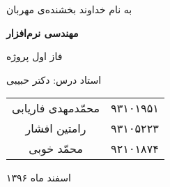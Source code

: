 \begin{center}
\large
به نام خداوند بخشنده‌ی مهربان

\Huge
\vspace*{3cm}
\textbf{مهندسی نرم‌افزار}

\vspace*{1cm}
\large
فاز اول پروژه
\vspace*{3cm}

\Large
استاد درس: دکتر حبیبی
\vspace*{2cm}

\vspace*{1cm}

\begin{tabular}{cc}
 محمّدمهدی فاریابی
	& 
۹۳۱۰۱۹۵۱
	\\
رامتین افشار
	&
۹۳۱۰۵۲۲۳
	 \\
محمّد خوبی
	&
۹۲۱۰۱۸۷۴
	 \\
\end{tabular}

 

\vspace*{3cm} 
\large

اسفند ماه ۱۳۹۶
\vspace*{5cm}

\end{center}
\newpage

